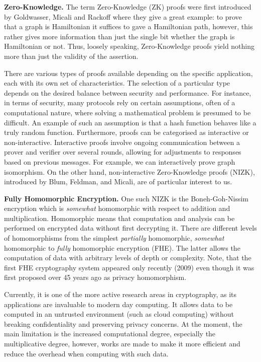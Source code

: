 \documentclass{Resources/UoBLab1}
\theoremstyle{definition}
\begin{document}
\noindent\textbf{Zero-Knowledge.} The term Zero-Knowledge (ZK) proofs were first introduced by Goldwasser, Micali and Rackoff\cite{ZKOrigin} where they give a great example: to prove that a graph is Hamiltonian it suffices to gave a Hamiltonian path, however, this rather gives more information than just the single bit whether the graph is Hamiltonian or not. Thus, loosely speaking, Zero-Knowledge proofs yield nothing more than just the validity of the assertion.

There are various types of proofs available depending on the specific application, each with its own set of characteristics. The selection of a particular type depends on the desired balance between security and performance. For instance, in terms of security, many protocols rely on certain assumptions, often of a computational nature, where solving a mathematical problem is presumed to be difficult. An example of such an assumption is that a hash function behaves like a truly random function\cite{RNGZK}. Furthermore, proofs can be categorised as interactive or non-interactive. Interactive proofs involve ongoing communication between a prover and verifier over several rounds, allowing for adjustments to responses based on previous messages. For example, we can interactively prove graph isomorphism\cite{ZKProofSystemsBook}. On the other hand, non-interactive Zero-Knowledge proofs (NIZK), introduced by Blum, Feldman, and Micali, are of particular interest to us.\medskip

\noindent\textbf{Fully Homomorphic Encryption.} One such NIZK is the Boneh-Goh-Nissim\cite{BGNCipher} encryption which is \textit{somewhat} homomorphic with respect to addition and multiplication. Homomorphic means that computation and analysis can be performed on encrypted data without first decrypting it. There are different levels of homomorphisms from the simplest \textit{partially} homomorphic, \textit{somewhat} homomorphic to \textit{fully} homomorphic encryption (FHE). The latter allows the computation of data with arbitrary levels of depth or complexity\cite{FHEPHD}. Note, that the first FHE cryptography system appeared only recently (2009\cite{FHEPHD}) even though it was first proposed over 45 years ago\cite{FHEMention} as privacy homomorphism.

Currently, it is one of the more active research areas in cryptography, as its applications are invaluable to modern day computing. It allows data to be computed in an untrusted environment (such as cloud computing) without breaking confidentiality and preserving privacy concerns. At the moment, the main limitation is the increased computational degree, especially the multiplicative degree, however, works are made to make it more efficient and reduce the overhead when computing with such data\cite{FHEImprovement1}\cite{FHEImprovement2}.\medskip
\end{document}
